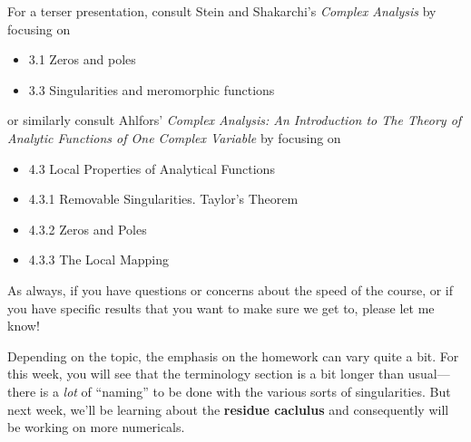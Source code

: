 \documentclass{homework}
\begin{document}
For a terser presentation, consult Stein and Shakarchi's \textit{Complex Analysis} by focusing on
\begin{itemize}
\item 3.1 Zeros and poles
\item 3.3 Singularities and meromorphic functions
\end{itemize}
or similarly consult Ahlfors' \textit{Complex Analysis: An Introduction to The Theory of Analytic Functions of One Complex Variable} by focusing on
\begin{itemize}
\item 4.3 Local Properties of Analytical Functions
\item 4.3.1 Removable Singularities. Taylor's Theorem
\item 4.3.2 Zeros and Poles
\item 4.3.3 The Local Mapping
\end{itemize}
As always, if you have questions or concerns about the speed of the
course, or if you have specific results that you want to make sure we
get to, please let me know!

Depending on the topic, the emphasis on the homework can vary quite a
bit.  For this week, you will see that the terminology section is a
bit longer than usual---there is a \textit{lot} of ``naming'' to be
done with the various sorts of singularities.  But next week, we'll be
learning about the \textbf{residue caclulus} and consequently will be
working on more numericals.
\end{document}
